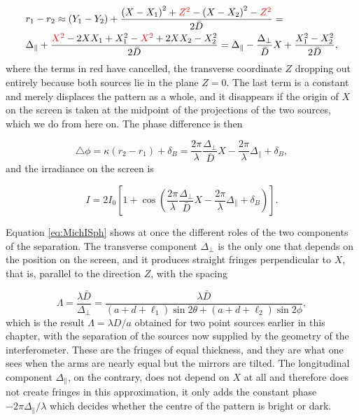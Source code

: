         \begin{align*}
            & r_1 - r_2 \approx \left(Y_1-Y_2\right) + \frac{\left(X-X_1\right)^{2} + {\color{red}Z^{2}} - \left(X-X_2\right)^{2} - {\color{red}Z^{2}}}{2\bar{D}} = \\
            & \Delta_\parallel + \frac{{\color{red}X^{2}} - 2XX_1 + X_1^{2} - {\color{red}X^{2}} + 2XX_2 - X_2^{2}}{2\bar{D}} = \Delta_\parallel - \frac{\Delta_\perp}{\bar{D}}X + \frac{X_1^{2}-X_2^{2}}{2\bar{D}},
        \end{align*}
        where the terms in red have cancelled, the transverse coordinate $Z$ dropping out entirely because both sources lie in the plane $Z=0$. The last term is a constant and merely displaces the pattern as a whole, and it disappears if the origin of $X$ on the screen is taken at the midpoint of the projections of the two sources, which we do from here on. The phase difference is then

        \begin{equation}\label{eq:MichPhaseSph}
            \triangle\phi = \kappa\left(r_2-r_1\right) + \delta_B = \frac{2\pi}{\lambda}\frac{\Delta_\perp}{\bar{D}}X - \frac{2\pi}{\lambda}\Delta_\parallel + \delta_B,
        \end{equation}
        and the irradiance on the screen is

        \begin{equation}\label{eq:MichISph}
            I = 2I_0\left[1+\cos\left(\frac{2\pi}{\lambda}\frac{\Delta_\perp}{\bar{D}}X - \frac{2\pi}{\lambda}\Delta_\parallel + \delta_B\right)\right].
        \end{equation}

        Equation \ref{eq:MichISph} shows at once the different roles of the two components of the separation. The transverse component $\Delta_\perp$ is the only one that depends on the position on the screen, and it produces straight fringes perpendicular to $X$, that is, parallel to the direction $Z$, with the spacing

        \begin{equation}\label{eq:MichLambdaSph}
            \Lambda = \frac{\lambda\bar{D}}{\Delta_\perp} = \frac{\lambda\bar{D}}{\left(a+d+\ell_1\right)\sin 2\theta + \left(a+d+\ell_2\right)\sin 2\phi},
        \end{equation}
        which is the result $\Lambda = \lambda D/a$ obtained for two point sources earlier in this chapter, with the separation of the sources now supplied by the geometry of the interferometer. These are the fringes of equal thickness, and they are what one sees when the arms are nearly equal but the mirrors are tilted. The longitudinal component $\Delta_\parallel$, on the contrary, does not depend on $X$ at all and therefore does not create fringes in this approximation, it only adds the constant phase $-2\pi\Delta_\parallel/\lambda$ which decides whether the centre of the pattern is bright or dark.

